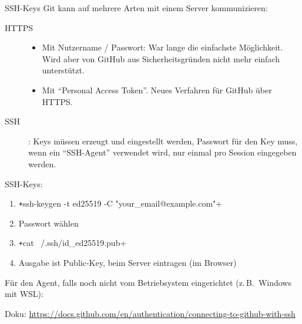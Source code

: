 \begin{frame}[fragile]{SSH-Keys}
  Git kann auf mehrere Arten mit einem Server kommunizieren:
  \begin{description}
    \item[HTTPS]
      \begin{itemize}
        \item Mit Nutzername / Passwort:
          War lange die einfachste Möglichkeit. Wird aber von GitHub aus Sicherheitsgründen nicht mehr einfach unterstützt.
        \item Mit \enquote{Personal Access Token}. Neues Verfahren für GitHub über HTTPS.
      \end{itemize}
    \item[SSH]: Keys müssen erzeugt und eingestellt werden, Passwort für den Key muss, wenn ein \enquote{SSH-Agent} verwendet wird, nur einmal pro Session eingegeben werden.
  \end{description}

  SSH-Keys:
  \begin{enumerate}
    \item \texttt+ssh-keygen -t ed25519 -C "your_email@example.com"+
    \item Passwort wählen
    \item \texttt+cat ~/.ssh/id_ed25519.pub+
    \item Ausgabe ist Public-Key, beim Server eintragen (im Browser)
  \end{enumerate}

  Für den Agent, falls noch nicht vom Betriebsystem eingerichtet (z.\,B.\ Windows mit WSL):

  Doku: \url{https://docs.github.com/en/authentication/connecting-to-github-with-ssh}
\end{frame}

